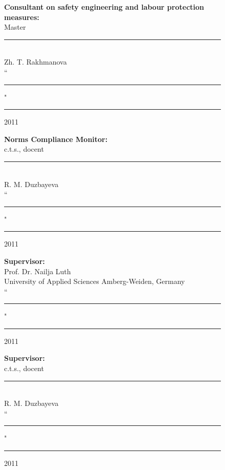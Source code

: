 \begin{titlepage}
\begin{figure}[ht]
\begin{minipage}[t]{0.5\linewidth}
\begin{flushleft}
				{\bf Consultant on safety engineering and labour protection measures:}\\
				Master\\
				\vspace{0.5\baselineskip}
				\rule{13em}{0.4pt}\\
				Zh. T. Rakhmanova\\
				\vspace{0.5\baselineskip}
				``\rule{2em}{0.4pt}" \rule{8em}{0.4pt} 2011\\
				\vspace{1\baselineskip}
				
				{\bf Norms Compliance Monitor:}\\
				c.t.s., docent\\
				\vspace{0.5\baselineskip}
				\rule{13em}{0.4pt}\\
				R. M. Duzbayeva\\
				\vspace{0.5\baselineskip}
				``\rule{2em}{0.4pt}" \rule{8em}{0.4pt} 2011\\
				\vspace{1\baselineskip}
				
				
				
			\end{flushleft}
		\end{minipage}
		\begin{minipage}[t]{0.5\linewidth}
			\begin{flushright}
				{\bf Supervisor:}\\
				Prof. Dr. Nailja Luth\\
				University of Applied Sciences Amberg-Weiden, Germany\\
				\vspace{0.5\baselineskip}
				``\rule{2em}{0.4pt}" \rule{8em}{0.4pt} 2011\\
				\vspace{1\baselineskip}

				{\bf Supervisor:}\\
				c.t.s., docent\\
				\vspace{0.5\baselineskip}
				\rule{13em}{0.4pt}\\
				R. M. Duzbayeva\\
				\vspace{0.5\baselineskip}
				``\rule{2em}{0.4pt}" \rule{8em}{0.4pt} 2011\\
				\vspace{1\baselineskip}


\end{flushright}
\end{minipage}
\end{figure}
\end{titlepage}
